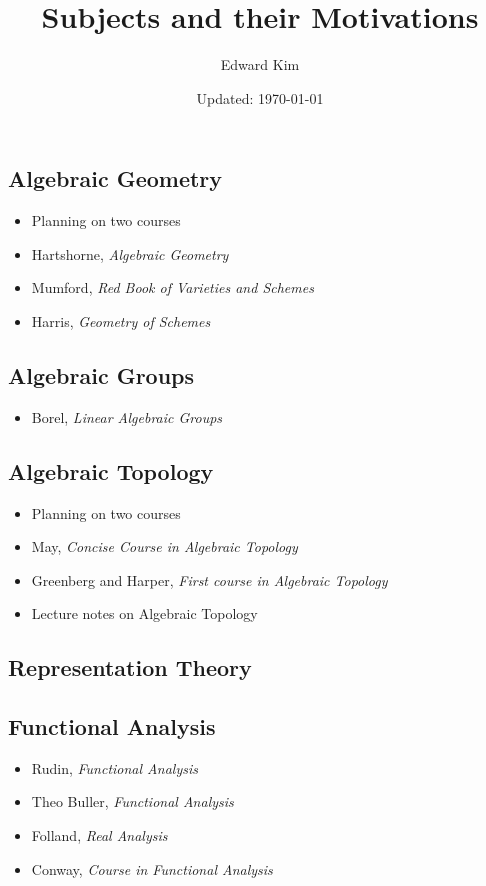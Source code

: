 \documentclass[12pt]{article}
\begin{document}
\title{ Subjects and their Motivations\vspace{-2ex}}
\date{\vspace{-2ex}Updated: \today}
\author{Edward Kim}
\maketitle

\subsection{Algebraic Geometry}
\begin{itemize}
  \item Planning on two courses
  \item Hartshorne, \textit{Algebraic Geometry}
  \item Mumford, \textit{Red Book of Varieties and Schemes}
  \item Harris, \textit{Geometry of Schemes}
\end{itemize}

\subsection{Algebraic Groups}
\begin{itemize}
  \item Borel, \textit{Linear Algebraic Groups}
\end{itemize}

\subsection{Algebraic Topology}
\begin{itemize}
  \item Planning on two courses
  \item May, \textit{Concise Course in Algebraic Topology}
  \item Greenberg and Harper, \textit{First course in Algebraic Topology}
  \item Lecture notes on Algebraic Topology
\end{itemize}

\subsection{Representation Theory}

\subsection{Functional Analysis}
\begin{itemize}
  \item Rudin, \textit{Functional Analysis}
  \item Theo Buller, \textit{Functional Analysis}
  \item Folland, \textit{Real Analysis}
  \item Conway, \textit{Course in Functional Analysis}
\end{itemize}
\end{document}
